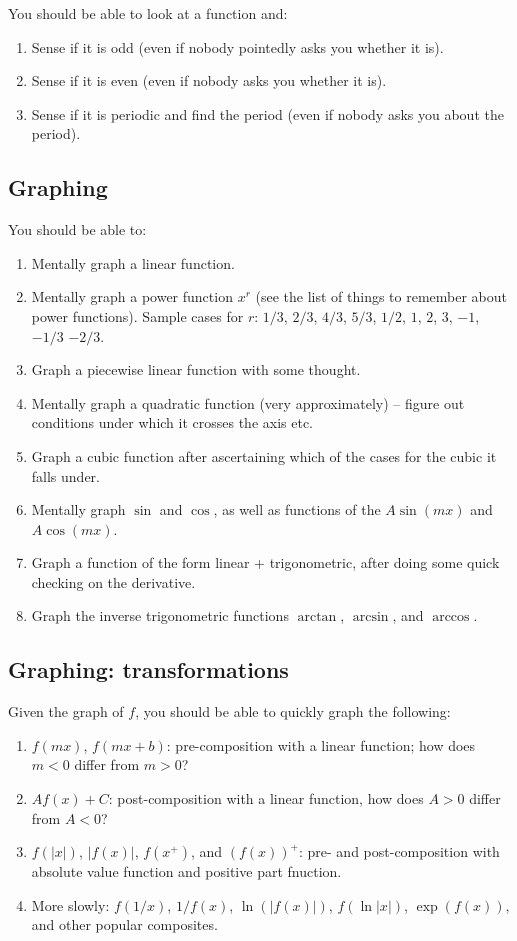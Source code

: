 \documentclass[10pt]{amsart}
\begin{document}
You should be able to look at a function and:

\begin{enumerate}
\item Sense if it is odd (even if nobody pointedly asks you whether it
  is).
\item Sense if it is even (even if nobody asks you whether it is).
\item Sense if it is periodic and find the period (even if nobody asks
  you about the period).
\end{enumerate}

\subsection{Graphing}

You should be able to:

\begin{enumerate}
\item Mentally graph a linear function.
\item Mentally graph a power function $x^r$ (see the list of things to
  remember about power functions). Sample cases for $r$: $1/3$, $2/3$,
  $4/3$, $5/3$, $1/2$, $1$, $2$, $3$, $-1$, $-1/3$ $-2/3$.
\item Graph a piecewise linear function with some thought.
\item Mentally graph a quadratic function (very approximately) --
  figure out conditions under which it crosses the axis etc.
\item Graph a cubic function after ascertaining which of the cases for
  the cubic it falls under.
\item Mentally graph $\sin$ and $\cos$, as well as functions of the $A
  \sin(mx)$ and $A\cos(mx)$.
\item Graph a function of the form linear + trigonometric, after doing
  some quick checking on the derivative.
\item Graph the inverse trigonometric functions $\arctan$, $\arcsin$,
  and $\arccos$.
\end{enumerate}

\subsection{Graphing: transformations}

Given the graph of $f$, you should be able to quickly graph the following:

\begin{enumerate}
\item $f(mx)$, $f(mx + b)$: pre-composition with a linear function;
  how does $m < 0$ differ from $m > 0$?
\item $Af(x) + C$: post-composition with a linear function, how does
  $A > 0$ differ from $A < 0$?
\item $f(|x|)$, $|f(x)|$, $f(x^+)$, and $(f(x))^+$: pre- and
  post-composition with absolute value function and positive part
  fnuction.
\item More slowly: $f(1/x)$, $1/f(x)$, $\ln(|f(x)|)$, $f(\ln|x|)$,
  $\exp(f(x))$, and other popular composites.
\end{enumerate}
\end{document}
